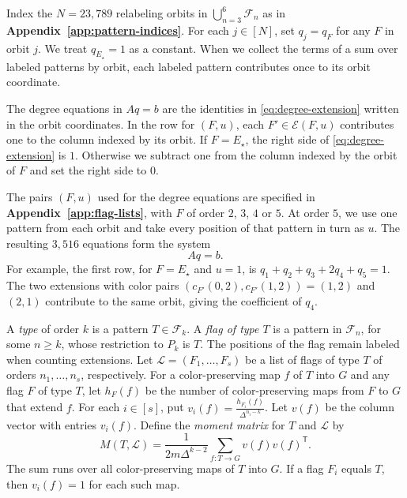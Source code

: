 \documentclass[preprint,11pt,numbers]{elsarticle-arxiv}
\numberwithin{equation}{section}
\theoremstyle{definition}
\begin{document}
Index the $N=23{,}789$ relabeling orbits in
$\bigcup_{n=3}^6\mathcal F_n$ as in \textbf{Appendix~\ref{app:pattern-indices}}.
For each $j\in[N]$, set $q_j=q_F$ for any $F$ in orbit $j$.
We treat $q_{E_\star}=1$ as a constant. When we collect the terms of a
sum over labeled patterns by orbit, each labeled pattern contributes
once to its orbit coordinate.

The degree equations in $Aq=b$ are the identities in
\eqref{eq:degree-extension} written in the orbit coordinates.
In the row for $(F,u)$, each $F'\in\mathcal E(F,u)$ contributes
one to the column indexed by its orbit. If $F=E_\star$, the right
side of \eqref{eq:degree-extension} is $1$. Otherwise we subtract
one from the column indexed by the orbit of $F$ and set the right
side to $0$.

The pairs $(F,u)$ used for the degree equations are specified
in \textbf{Appendix~\ref{app:flag-lists}}, with $F$ of order $2$, $3$,
$4$ or $5$. At order $5$, we use one pattern from each orbit and
take every position of that pattern in turn as $u$. The resulting
$3{,}516$ equations form the system
\begin{equation}\label{eq:linear-system}
 Aq=b.
\end{equation}
For example, the first row, for $F=E_\star$ and $u=1$, is
$q_1+q_2+q_3+2q_4+q_5=1$. The two extensions with color pairs
$(c_{F'}(0,2),c_{F'}(1,2))=(1,2)$ and $(2,1)$ contribute to
the same orbit, giving the coefficient of $q_4$.

A \emph{type} of order $k$ is a pattern $T\in\mathcal F_k$.
A \emph{flag of type $T$} is a pattern in $\mathcal F_n$, for some
$n\geq k$, whose restriction to $P_k$ is $T$. The positions of the
flag remain labeled when counting extensions. Let
$\mathcal L=(F_1,\ldots,F_s)$ be a list of flags of type $T$ of
orders $n_1,\ldots,n_s$, respectively. For a color-preserving map
$f$ of $T$ into $G$ and any flag $F$ of type $T$, let $h_F(f)$ be
the number of color-preserving maps from $F$ to $G$ that extend
$f$. For each $i\in[s]$, put $v_i(f)=\frac{h_{F_i}(f)}{\Delta^{n_i-k}}$.
Let $v(f)$ be the column vector with entries $v_i(f)$. Define the
\emph{moment matrix} for $T$ and $\mathcal L$ by
\begin{equation}\label{eq:moment-definition}
 M(T,\mathcal L)=\frac{1}{2m\Delta^{k-2}}
       \sum_{f:T\to G}v(f)v(f)^{\mathsf T}.
\end{equation}
The sum runs over all color-preserving maps of $T$ into $G$. If a
flag $F_i$ equals $T$, then $v_i(f)=1$ for each such map.
\end{document}

